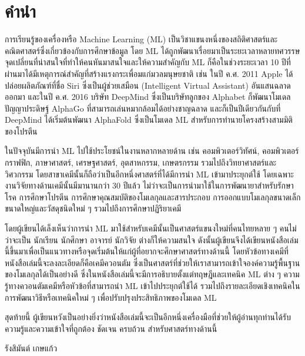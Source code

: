 

\chapter*{คำนำ}

การเรียนรู้ของเครื่องหรือ Machine Learning (ML) เป็นวิชาแขนงหนึ่งของสถิติศาสตร์และคณิตศาสตร์ซึ่งเกี่ยวข้องกับการศึกษาข้อมูล 
โดย ML ได้ถูกพัฒนาเรื่อยมาเป็นระยะเวลาหลายทศวรรษ จุดเปลี่ยนที่น่าสนใจที่ทำให้คนหันมาสนใจและให้ความสำคัญกับ ML
ก็คือในช่วงระยะเวลา 10 ปีที่ผ่านมาได้มีเหตุการณ์สำคัญที่สร้างแรงกระเพื่อมแก่มวลมนุษยชาติ เช่น ในปี ค.ศ. 2011 Apple ได้ปล่อยผลิตภัณฑ์ที่ชื่อ 
Siri ซึ่งเป็นผู้ช่วยเสมือน (Intelligent Virtual Assistant) อันแสนฉลาดออกมา และในปี ค.ศ. 2016 บริษัท DeepMind ซึ่งเป็นบริษัทลูกของ
Alphabet ก็พัฒนาโมเดลปัญญาประดิษฐ์ AlphaGo ที่สามารถเล่นหมากล้อมได้อย่างชาญฉลาด และก็เป็นปีเดียวกันกับที่ DeepMind ได้เริ่มต้นพัฒนา AlphaFold
ซึ่งเป็นโมเดล ML สำหรับการทำนายโครงสร้างสามมิติของโปรตีน

ในปัจจุบันมีการนำ ML ไปใช้ประโยชน์ในงานหลากหลายด้าน เช่น คอมพิวเตอร์วิทัศน์, คอมพิวเตอร์กราฟฟิก, ภาษาศาสตร์, เศรษฐศาสตร์, 
อุตสาหกรรม, เกษตรกรรม รวมไปถึงวิทยาศาสตร์และวิศวกรรม โดยสาขาเคมีนั้นก็ถือว่าเป็นอีกหนึ่งศาสตร์ที่ได้มีการนำ ML เข้ามาประยุกต์ใช้
โดยเฉพาะงานวิจัยทางด้านเคมีนั้นมีมานานกว่า 30 ปีแล้ว ไม่ว่าจะเป็นการนำมาใช้ในการพัฒนายาสำหรับรักษาโรค การศึกษาโปรตีน 
การศึกษาคุณสมบัติของโมเลกุลและสารประกอบ การออกแบบโมเลกุลขนาดเล็ก ขนาดใหญ่และวัสดุชนิดใหม่ ๆ รวมไปถึงการศึกษาปฏิริยาเคมี

โดยผู้เขียนได้เล็งเห็นว่าการนำ ML มาใช้สำหรับเคมีนั้นเป็นศาสตร์แขนงใหม่ที่คนไทยหลาย ๆ คนไม่ว่าจะเป็น นักเรียน นักศึกษา อาจารย์ นักวิจัย
ต่างก็ให้ความสนใจ ดังนั้นผู้เขียนจึงได้เขียนหนังสือเล่มนี้ขึ้นมาเพื่อเป็นแนวทางหรือจุดเริ่มต้นให้แก่ผู้ที่อยากจะศึกษาศาสตร์ทางด้านนี้ 
โดยหัวข้อทางเคมีที่หนังสือเล่มนี้จะลงละเอียดก็คือเคมีควอนตัม ซึ่งเป็นศาสตร์ที่ช่วยให้เราสามารถเข้าใจองค์ความรู้พื้นฐานของโมเลกุลได้เป็นอย่างดี 
ซึ่งในหนังสือเล่มนี้จะมีการอธิบายตั้งแต่ทฤษฎีและเทคนิค ML ต่าง ๆ ความรู้ทางควอนตัมเคมีหรือหัวข้อที่สามารถนำ ML เข้าไปประยุกต์ใช้ได้ 
รวมไปถึงรายละเอียดเชิงเทคนิคในการพัฒนาวิธีหรือเทคนิคใหม่ ๆ เพื่อปรับปรุงประสิทธิภาพของโมเดล ML 

สุดท้ายนี้ ผู้เขียนหวังเป็นอย่างยิ่งว่าหนังสือเล่มนี้จะเป็นอีกหนึ่งเครื่องมือที่ช่วยให้ผู้อ่านทุกท่านได้รับความรู้และความเข้าใจที่ถูกต้อง ชัดเจน ครบถ้วน
สำหรับศาสตร์ทางด้านนี้

\medskip

\begin{flushright}
รังสิมันต์ เกษแก้ว
\end{flushright}